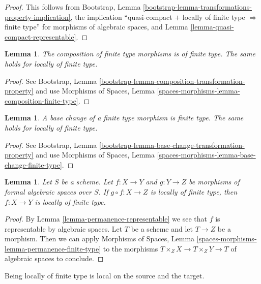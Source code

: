 \documentclass{stacks-project}
\theoremstyle{plain}
\newtheorem{lemma}[subsection]{Lemma}
\theoremstyle{definition}
\theoremstyle{remark}
\numberwithin{equation}{subsection}
\begin{document}
\begin{proof}
This follows from Bootstrap, Lemma
\ref{bootstrap-lemma-transformations-property-implication},
the implication ``quasi-compact $+$ locally of finite type
$\Rightarrow$ finite type'' for morphisms of algebraic spaces, and
Lemma \ref{lemma-quasi-compact-representable}.
\end{proof}

\begin{lemma}
\label{lemma-composition-finite-type}
The composition of finite type morphisms is of finite type.
The same holds for locally of finite type.
\end{lemma}

\begin{proof}
See Bootstrap, Lemma \ref{bootstrap-lemma-composition-transformation-property}
and use Morphisms of Spaces, Lemma
\ref{spaces-morphisms-lemma-composition-finite-type}.
\end{proof}

\begin{lemma}
\label{lemma-base-change-finite-type}
A base change of a finite type morphism is finite type.
The same holds for locally of finite type.
\end{lemma}

\begin{proof}
See Bootstrap, Lemma \ref{bootstrap-lemma-base-change-transformation-property}
and use Morphisms of Spaces, Lemma
\ref{spaces-morphisms-lemma-base-change-finite-type}.
\end{proof}

\begin{lemma}
\label{lemma-permanence-finite-type}
Let $S$ be a scheme. Let $f : X \to Y$ and $g : Y \to Z$ be morphisms of
formal algebraic spaces over $S$. If $g \circ f : X \to Z$ is locally of
finite type, then $f : X \to Y$ is locally of finite type.
\end{lemma}

\begin{proof}
By Lemma \ref{lemma-permanence-representable} we see that $f$ is
representable by algebraic spaces. Let $T$ be a scheme and let
$T \to Z$ be a morphism. Then we can apply
Morphisms of Spaces, Lemma \ref{spaces-morphisms-lemma-permanence-finite-type}
to the morphisms
$T \times_Z X \to T \times_Z Y \to T$ of algebraic spaces to conclude.
\end{proof}

\noindent
Being locally of finite type is local on the source and the target.
\end{document}
